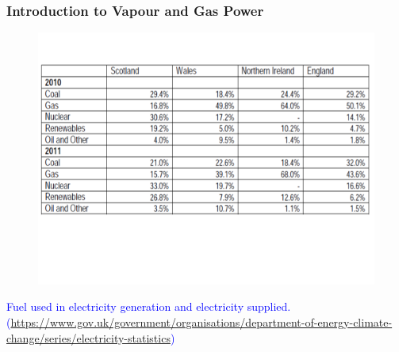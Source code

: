 \documentclass[10pt,compress]{beamer}
\begin{document}
\begin{frame}
 \frametitle{Introduction to Vapour and Gas Power}
    \begin{figure}%
     \begin{center}
      \includegraphics[width=9.cm,clip]{./Pics/Energy_Share_UK}
     \end{center}
    \end{figure}
\vspace{-2cm}
\textcolor{blue}{Fuel used in electricity generation and electricity supplied. (\href{https://www.gov.uk/government/organisations/department-of-energy-climate-change/series/electricity-statistics}{https://www.gov.uk/government/organisations/department-of-energy-climate-change/series/electricity-statistics})}
 \normalsize
\end{frame}
\end{document}
